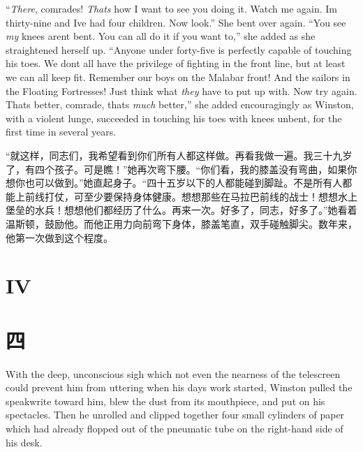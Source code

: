 \begin{paracol}{2}
``\emph{There}, comrades! \emph{That\textquotesingle s} how I want to see
you doing it. Watch me again. I\textquotesingle m thirty-nine and
I\textquotesingle ve had four children. Now look.'' She bent over again.
``You see \emph{my} knees aren\textquotesingle t bent. You can all do it
if you want to,'' she added as she straightened herself up. ``Anyone under
forty-five is perfectly capable of touching his toes. We
don\textquotesingle t all have the privilege of fighting in the front
line, but at least we can all keep fit. Remember our boys on the Malabar
front! And the sailors in the Floating Fortresses! Just think what
\emph{they} have to put up with. Now try again. That\textquotesingle s
better, comrade, that\textquotesingle s \emph{much} better,'' she added
encouragingly as Winston, with a violent lunge, succeeded in touching
his toes with knees unbent, for the first time in several years.

\switchcolumn

``就这样，同志们，我希望看到你们所有人都这样做。再看我做一遍。我三十九岁了，有四个孩子。可是瞧！''她再次弯下腰。``你们看，我的膝盖没有弯曲，如果你想你也可以做到。''她直起身子。``四十五岁以下的人都能碰到脚趾。不是所有人都能上前线打仗，可至少要保持身体健康。想想那些在马拉巴前线的战士！想想水上堡垒的水兵！想想他们都经历了什么。再来一次。好多了，同志，好多了。''她看着温斯顿，鼓励他。而他正用力向前弯下身体，膝盖笔直，双手碰触脚尖。数年来，他第一次做到这个程度。

\switchcolumn*


\section{IV}\label{iv}

\switchcolumn

\section*{四}\label{ux56db}

\switchcolumn*

With the deep, unconscious sigh which not even the nearness of the
telescreen could prevent him from uttering when his
day\textquotesingle s work started, Winston pulled the speakwrite toward
him, blew the dust from its mouthpiece, and put on his spectacles. Then
he unrolled and clipped together four small cylinders of paper which had
already flopped out of the pneumatic tube on the right-hand side of his
desk.

\switchcolumn


\end{paracol}
